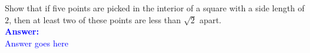 \item{}
Show that if five points are picked in the interior of a square with a side
length of $2$, then at least two of these points are less than $\sqrt{2}$
apart.\\[12pt]
\ifanswers
\textcolor{blue}{
\textbf{Answer:}\\[6pt]
Answer goes here
}
\newpage
\fi
